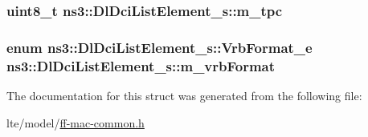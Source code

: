 \subsubsection[{\texorpdfstring{m\+\_\+tpc}{m_tpc}}]{\setlength{\rightskip}{0pt plus 5cm}uint8\+\_\+t ns3\+::\+Dl\+Dci\+List\+Element\+\_\+s\+::m\+\_\+tpc}\hypertarget{structns3_1_1DlDciListElement__s_aee53e877b91346eaff966474c8bace8b}{}\label{structns3_1_1DlDciListElement__s_aee53e877b91346eaff966474c8bace8b}
\subsubsection[{\texorpdfstring{m\+\_\+vrb\+Format}{m_vrbFormat}}]{\setlength{\rightskip}{0pt plus 5cm}enum {\bf ns3\+::\+Dl\+Dci\+List\+Element\+\_\+s\+::\+Vrb\+Format\+\_\+e}  ns3\+::\+Dl\+Dci\+List\+Element\+\_\+s\+::m\+\_\+vrb\+Format}\hypertarget{structns3_1_1DlDciListElement__s_a0a331933f4b624878224b003c786a606}{}\label{structns3_1_1DlDciListElement__s_a0a331933f4b624878224b003c786a606}


The documentation for this struct was generated from the following file\+:\begin{DoxyCompactItemize}
\item 
lte/model/\hyperlink{ff-mac-common_8h}{ff-\/mac-\/common.\+h}\end{DoxyCompactItemize}
